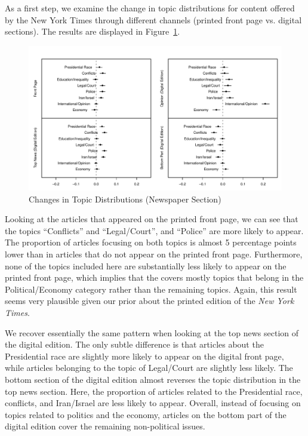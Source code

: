 \documentclass[12pt]{article}
\begin{document}
\begin{doublespace}
As a first step, we examine the change in topic distributions for content offered by the New York Times through different channels (printed front page vs. digital sections). The results are displayed in Figure~\ref{fig:res_nyt_polecon}.

\begin{figure}
\caption{Changes in Topic Distributions (Newspaper Section)}\label{fig:res_nyt_polecon}
\includegraphics[width=\textwidth]{../calc/fig/res_nyt_polecon}
\end{figure}

Looking at the articles that appeared on the printed front page, we can see that the topics ``Conflicts'' and ``Legal/Court'', and ``Police'' are more likely to appear. The proportion of articles focusing on both topics is almost 5 percentage points lower than in articles that do not appear on the printed front page. Furthermore, none of the topics included here are substantially less likely to appear on the printed front page, which implies that the covers mostly topics that belong in the Political/Economy category rather than the remaining topics. Again, this result seems very plausible given our prior about the printed edition of the \textit{New York Times}.

We recover essentially the same pattern when looking at the top news section of the digital edition. The only subtle difference is that articles about the Presidential race are slightly more likely to appear on the digital front page, while articles belonging to the topic of Legal/Court are slightly less likely. The bottom section of the digital edition almost reverses the topic distribution in the top news section. Here, the proportion of articles related to the Presidential race, conflicts, and Iran/Israel are less likely to appear. Overall, instead of focusing on topics related to politics and the economy, articles on the bottom part of the digital edition cover the remaining non-political issues.


\end{doublespace}
\end{document}

